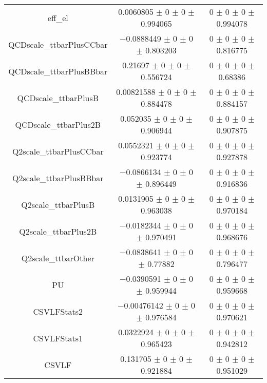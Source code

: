 \begin{table}
\begin{tabular}{ccc}
eff\_el 	& \num{0.0060805} $\pm$ \num{0} $\pm$ \num{0} $\pm$ \num{0.994065} 	& \num{0} $\pm$ \num{0} $\pm$ \num{0} $\pm$ \num{0.994078}\\
QCDscale\_ttbarPlusCCbar 	& \num{-0.0888449} $\pm$ \num{0} $\pm$ \num{0} $\pm$ \num{0.803203} 	& \num{0} $\pm$ \num{0} $\pm$ \num{0} $\pm$ \num{0.816775}\\
QCDscale\_ttbarPlusBBbar 	& \num{0.21697} $\pm$ \num{0} $\pm$ \num{0} $\pm$ \num{0.556724} 	& \num{0} $\pm$ \num{0} $\pm$ \num{0} $\pm$ \num{0.68386}\\
QCDscale\_ttbarPlusB 	& \num{0.00821588} $\pm$ \num{0} $\pm$ \num{0} $\pm$ \num{0.884478} 	& \num{0} $\pm$ \num{0} $\pm$ \num{0} $\pm$ \num{0.884157}\\
QCDscale\_ttbarPlus2B 	& \num{0.052035} $\pm$ \num{0} $\pm$ \num{0} $\pm$ \num{0.906944} 	& \num{0} $\pm$ \num{0} $\pm$ \num{0} $\pm$ \num{0.907875}\\
Q2scale\_ttbarPlusCCbar 	& \num{0.0552321} $\pm$ \num{0} $\pm$ \num{0} $\pm$ \num{0.923774} 	& \num{0} $\pm$ \num{0} $\pm$ \num{0} $\pm$ \num{0.927878}\\
Q2scale\_ttbarPlusBBbar 	& \num{-0.0866134} $\pm$ \num{0} $\pm$ \num{0} $\pm$ \num{0.896449} 	& \num{0} $\pm$ \num{0} $\pm$ \num{0} $\pm$ \num{0.916836}\\
Q2scale\_ttbarPlusB 	& \num{0.0131905} $\pm$ \num{0} $\pm$ \num{0} $\pm$ \num{0.963038} 	& \num{0} $\pm$ \num{0} $\pm$ \num{0} $\pm$ \num{0.970184}\\
Q2scale\_ttbarPlus2B 	& \num{-0.0182344} $\pm$ \num{0} $\pm$ \num{0} $\pm$ \num{0.970491} 	& \num{0} $\pm$ \num{0} $\pm$ \num{0} $\pm$ \num{0.968676}\\
Q2scale\_ttbarOther 	& \num{-0.0838641} $\pm$ \num{0} $\pm$ \num{0} $\pm$ \num{0.77882} 	& \num{0} $\pm$ \num{0} $\pm$ \num{0} $\pm$ \num{0.796477}\\
PU 	& \num{-0.0390591} $\pm$ \num{0} $\pm$ \num{0} $\pm$ \num{0.959944} 	& \num{0} $\pm$ \num{0} $\pm$ \num{0} $\pm$ \num{0.959668}\\
CSVLFStats2 	& \num{-0.00476142} $\pm$ \num{0} $\pm$ \num{0} $\pm$ \num{0.976584} 	& \num{0} $\pm$ \num{0} $\pm$ \num{0} $\pm$ \num{0.970621}\\
CSVLFStats1 	& \num{0.0322924} $\pm$ \num{0} $\pm$ \num{0} $\pm$ \num{0.965423} 	& \num{0} $\pm$ \num{0} $\pm$ \num{0} $\pm$ \num{0.942812}\\
CSVLF 	& \num{0.131705} $\pm$ \num{0} $\pm$ \num{0} $\pm$ \num{0.921884} 	& \num{0} $\pm$ \num{0} $\pm$ \num{0} $\pm$ \num{0.951029}\\

\end{tabular}
\end{table}
